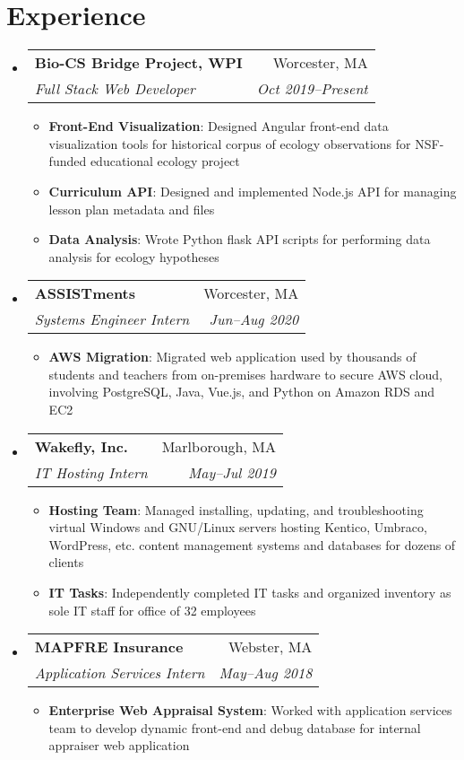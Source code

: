 \documentclass[a4paper,11pt]{article}
\makeatletter
\newcommand{\resumeItem}[2]{
  \item\small{
    \textbf{#1}{: #2 \vspace{-2pt}}
  }
}
\newcommand{\resumeSubheading}[4]{
  \vspace{-1pt}\item
    \begin{tabular*}{0.97\textwidth}{l@{\extracolsep{\fill}}r}
      \textbf{#1} & #2 \\
      \textit{\small#3} & \textit{\small #4} \\
    \end{tabular*}\vspace{-5pt}
}
\newcommand{\resumeSubHeadingListStart}{\begin{itemize}[leftmargin=*]}
\newcommand{\resumeSubHeadingListEnd}{\end{itemize}}
\newcommand{\resumeItemListStart}{\begin{itemize}}
\newcommand{\resumeItemListEnd}{\end{itemize}\vspace{-5pt}}
\makeatother
\begin{document}
\section{Experience}
  \resumeSubHeadingListStart
	\resumeSubheading
	  {Bio-CS Bridge Project, WPI}{Worcester, MA}
	  {Full Stack Web Developer}{Oct 2019--Present}
	  \resumeItemListStart
		  \resumeItem{Front-End Visualization} {Designed Angular front-end data
			  visualization tools for historical corpus of ecology observations
			  for NSF-funded educational ecology project} 
		  \resumeItem{Curriculum API} {Designed and implemented Node.js API for
			  managing lesson plan metadata and files}
		  \resumeItem{Data Analysis} {Wrote Python flask API scripts for
			  performing data analysis for ecology hypotheses}
	  \resumeItemListEnd

	\resumeSubheading
	  {ASSISTments}{Worcester, MA}
	  {Systems Engineer Intern}{Jun--Aug 2020}
	  \resumeItemListStart
		  \resumeItem{AWS Migration} {Migrated web
			  application used by thousands of students and teachers from
			  on-premises hardware to secure AWS cloud, involving PostgreSQL,
			  Java, Vue.js, and Python on Amazon RDS and EC2} 
	  \resumeItemListEnd
  	
    \resumeSubheading
      {Wakefly, Inc.}{Marlborough, MA}
      {IT Hosting Intern}{May--Jul 2019}
      \resumeItemListStart
        \resumeItem{Hosting Team}
		  {Managed installing, updating, and troubleshooting virtual Windows and
			  GNU/Linux servers hosting Kentico, Umbraco, WordPress, etc.
			  content management systems and databases for dozens of clients}
		\resumeItem{IT Tasks}
		  {Independently completed IT tasks and organized inventory as sole IT
			  staff for office of 32 employees}
      \resumeItemListEnd

    \resumeSubheading
      {MAPFRE Insurance}{Webster, MA}
      {Application Services Intern}{May--Aug 2018}
      \resumeItemListStart
	    \resumeItem{Enterprise Web Appraisal System}
		{Worked with application services team to develop dynamic front-end and
			debug database for internal appraiser web application}
      \resumeItemListEnd
  \resumeSubHeadingListEnd


\end{document}
